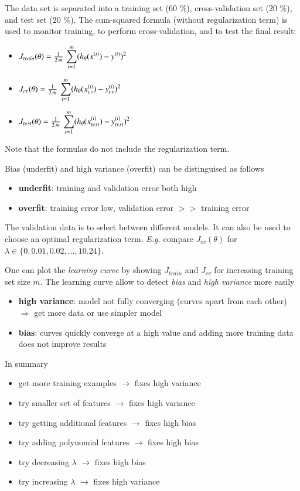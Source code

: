 \documentclass[a4paper,twoside,10pt]{article}
\begin{document}
The data set is separated into a training set (60 \%), cross-validation set (20 \%), and test set (20 \%).
The sum-squared formula (without regularization term) is used to monitor training, to perform cross-validation, and to test the final result:
\begin{itemize}
  \item $J_{train}(\theta)=\frac{1}{2\,m}\,\displaystyle\sum_{i=1}^m(h_\theta(x^{(i)})-y^{(i)})^2$
  \item $J_{cv}(\theta)=\frac{1}{2\,m}\,\displaystyle\sum_{i=1}^m(h_\theta(x^{(i)}_{cv})-y^{(i)}_{cv})^2$
  \item $J_{test}(\theta)=\frac{1}{2\,m}\,\displaystyle\sum_{i=1}^m(h_\theta(x^{(i)}_{test})-y^{(i)}_{test})^2$
\end{itemize}
Note that the formulas do not include the regularization term.

Bias (underfit) and high variance (overfit) can be distinguised as follows
\begin{itemize}
  \item \textbf{underfit}: training and validation error both high
  \item \textbf{overfit}: training error low, validation error $>>$ training error
\end{itemize}

The validation data is to select between different models. It can also be used to choose an optimal regularization term. \emph{E.g.} compare $J_{cv}(\theta)$ for $\lambda\in\{0,0.01,0.02,\ldots,10.24\}$.

One can plot the \emph{learning curve} by showing $J_{train}$ and $J_{cv}$ for increasing training set size $m$.
The learning curve allow to detect \emph{bias} and \emph{high variance} more easily
\begin{itemize}
  \item \textbf{high variance}: model not fully converging (curves apart from each other) $\Rightarrow$ get more data or use simpler model
  \item \textbf{bias}: curves quickly converge at a high value and adding more training data does not improve results
\end{itemize}

In summary
\begin{itemize}
  \item get more training examples $\rightarrow$ fixes high variance
  \item try smaller set of features $\rightarrow$ fixes high variance
  \item try getting additional features $\rightarrow$ fixes high bias
  \item try adding polynomial features $\rightarrow$ fixes high bias
  \item try decreasing $\lambda$ $\rightarrow$ fixes high bias
  \item try increasing $\lambda$ $\rightarrow$ fixes high variance
\end{itemize}
\end{document}
